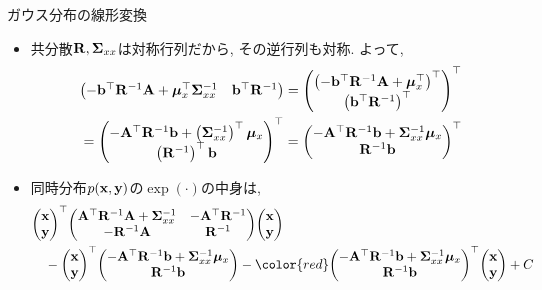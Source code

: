 \documentclass[dvipdfmx,notheorems,t]{beamer}
\begin{document}
\begin{frame}{ガウス分布の線形変換}
\begin{itemize}
  \item 共分散$\vb{R}, \vb{\Sigma}_{xx}$は対称行列だから, その逆行列も対称. よって,
  {\small \begin{align*}
    & \mqty(-\vb{b}^\top \vb{R}^{-1} \vb{A} + \vb*{\mu}_x^\top \vb{\Sigma}_{xx}^{-1} & \vb{b}^\top \vb{R}^{-1})
    = \mqty(\left( -\vb{b}^\top \vb{R}^{-1} \vb{A} + \vb*{\mu}_x^\top \right)^\top \\
      \left( \vb{b}^\top \vb{R}^{-1} \right)^\top)^\top \\
    &= \mqty(-\vb{A}^\top \vb{R}^{-1} \vb{b} + \left( \vb{\Sigma}_{xx}^{-1} \right)^\top \vb*{\mu}_x \\
      \left( \vb{R}^{-1} \right)^\top \vb{b})^\top
    = \mqty(-\vb{A}^\top \vb{R}^{-1} \vb{b} + \vb{\Sigma}_{xx}^{-1} \vb*{\mu}_x \\ \vb{R}^{-1} \vb{b})^\top
  \end{align*}}
  \item 同時分布$p(\vb{x}, \vb{y})$の$\exp(\cdot)$の中身は,
  {\small \begin{align*}
    & \mqty(\vb{x} \\ \vb{y})^\top
      \mqty(\vb{A}^\top \vb{R}^{-1} \vb{A} + \vb{\Sigma}_{xx}^{-1} & -\vb{A}^\top \vb{R}^{-1} \\
      -\vb{R}^{-1} \vb{A} & \vb{R}^{-1}) \mqty(\vb{x} \\ \vb{y}) \\
    & \quad - \mqty(\vb{x} \\ \vb{y})^\top
      \mqty(-\vb{A}^\top \vb{R}^{-1} \vb{b} + \vb{\Sigma}_{xx}^{-1} \vb*{\mu}_x \\ \vb{R}^{-1} \vb{b})
      - {\color{red} \mqty(-\vb{A}^\top \vb{R}^{-1} \vb{b} + \vb{\Sigma}_{xx}^{-1} \vb*{\mu}_x \\ \vb{R}^{-1} \vb{b})^\top}
      \mqty(\vb{x} \\ \vb{y}) + C
  \end{align*}}
\end{itemize}
\end{frame}
\end{document}
